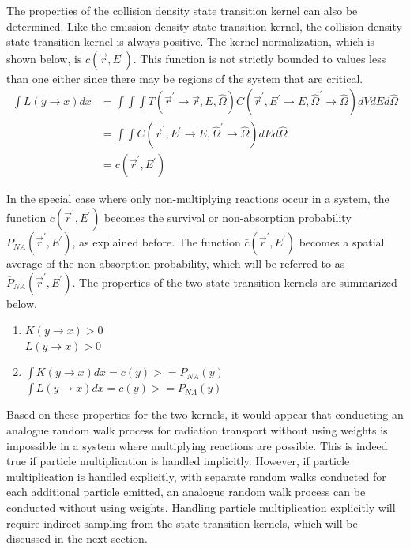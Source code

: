The properties of the collision density state transition kernel can also be
determined. Like the emission density state transition kernel, the collision
density state transition kernel is always positive. The kernel normalization, 
which is shown below, is $c(\vec{r},E^{'})$. This function is not strictly 
bounded to values less than one either since there may be regions of the system 
that are critical.
\begin{align}
  \int L(y \to x) dx & = \int\int\int
  T(\vec{r}^{'} \to \vec{r},E,\hat{\Omega})
  C(\vec{r}^{'},E^{'} \to E,\hat{\Omega}^{'} \to \hat{\Omega}) dV dE d\hat{\Omega}
  \nonumber \\
  & = \int\int 
  C(\vec{r}^{'},E^{'} \to E,\hat{\Omega}^{'} \to \hat{\Omega}) dE d\hat{\Omega} 
  \nonumber \\
  & = c(\vec{r}^{'},E^{'})
\end{align}

In the special case where only non-multiplying reactions occur in a system,
the function $c(\vec{r}^{'},E^{'})$ becomes the survival or non-absorption
probability $P_{NA}(\vec{r}^{'},E^{'})$, as explained before. The function
$\bar{c}(\vec{r}^{'},E^{'})$ becomes a spatial average of the non-absorption
probability, which will be referred to as $\overline{P}_{NA}(\vec{r}^{'},E^{'})$. 
The properties of the two state transition kernels are summarized below.
\begin{enumerate}
  \item $K(y \to x) > 0$ \\
    $L(y \to x) > 0$
  \item $\int K(y \to x)dx = \bar{c}(y) >= \overline{P}_{NA}(y)$ \\
    $\int L(y \to x)dx = c(y) >= P_{NA}(y)$
\end{enumerate}

Based on these properties for the two kernels, it would appear that 
conducting an analogue random walk process for radiation transport without 
using weights is impossible in a system where multiplying reactions are 
possible. This is indeed true if particle multiplication is handled implicitly. 
However, if particle multiplication is handled explicitly, with separate 
random walks conducted for each additional particle emitted, an analogue 
random walk process can be conducted without using weights. Handling
particle multiplication explicitly will require indirect sampling from the 
state transition kernels, which will be discussed in the next section.

